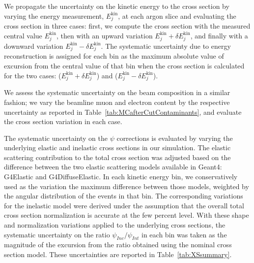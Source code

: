 \documentclass[%
 floatfix,
 reprint,
 twocolumn,
superscriptaddress,
showpacs,preprintnumbers,
 amsmath,amssymb,
 aps,
prd,
]{revtex4-1}
\begin{document}
We propagate the uncertainty on the kinetic energy to the cross section by varying the energy measurement, $E^\text{kin}_{j}$, at each argon slice and evaluating the cross section in three cases: first, we compute the cross section with the measured central value $E^\text{kin}_{j}$, then with an upward variation  $E^\text{kin}_{j} + \delta E^\text{kin}_{j}$, and finally with a downward variation  $E^\text{kin}_{j} - \delta E^\text{kin}_{j}$. The systematic uncertainty due to energy reconstruction is assigned for each bin as the maximum absolute value of excursion from the central value of that bin when the cross section is calculated for the two cases: ($E^\text{kin}_{j} + \delta E^\text{kin}_{j}$) and ($E^\text{kin}_{j} - \delta E^\text{kin}_{j}$). 


We assess the systematic uncertainty on the beam composition in a similar fashion; we vary the beamline muon and electron content  by the respective uncertainty as reported in Table~\ref{tab:MCafterCutContaminants}, and evaluate the cross section variation in each case.  


The systematic uncertainty on the $\psi$ corrections is evaluated by varying the underlying elastic and inelastic cross sections in our simulation. 
The elastic scattering contribution to the total cross section was adjusted based on the difference between the two elastic scattering models available in Geant4: G4Elastic and G4DiffuseElastic. In each kinetic energy bin, we conservatively used as the variation the maximum difference between those models, weighted by the angular distribution of the events in that bin. The corresponding variations for the inelastic model were derived under the assumption that the overall total cross section normalization is accurate at the few percent level.
With these shape and normalization variations applied to the underlying cross sections, the systematic uncertainty on the ratio $\psi_{Inc}/\psi_{Int}$ in each bin was taken as the magnitude of the excursion from the ratio obtained using the nominal cross section model. These uncertainties are reported in Table~\ref{tab:XSsummary}.  
\end{document}
